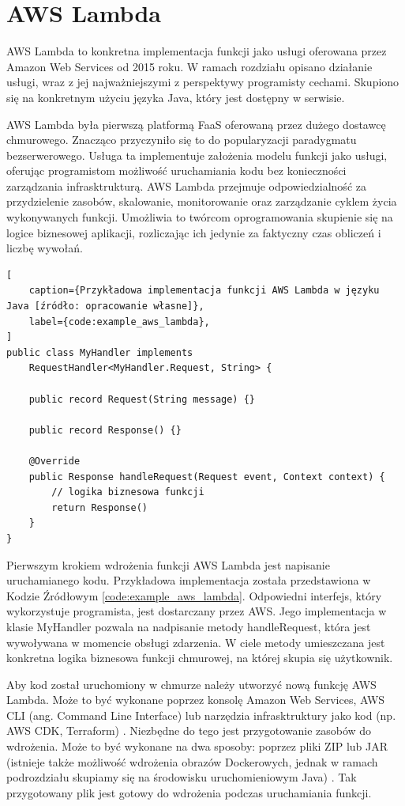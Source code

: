 \section{AWS Lambda}\label{chapter:aws_lambda}

AWS Lambda to konkretna implementacja funkcji jako usługi oferowana przez Amazon Web Services od 2015 roku.
W ramach rozdziału opisano działanie usługi, wraz z jej najważniejszymi z perspektywy programisty cechami.
Skupiono się na konkretnym użyciu języka Java, który jest dostępny w serwisie.

AWS Lambda była pierwszą platformą FaaS oferowaną przez dużego dostawcę chmurowego.
Znacząco przyczyniło się to do popularyzacji paradygmatu bezserwerowego.
Usługa ta implementuje założenia modelu funkcji jako usługi, oferując programistom możliwość uruchamiania kodu bez konieczności zarządzania infrasktrukturą.
AWS Lambda przejmuje odpowiedzialność za przydzielenie zasobów, skalowanie, monitorowanie oraz zarządzanie cyklem życia wykonywanych funkcji.
Umożliwia to twórcom oprogramowania skupienie się na logice biznesowej aplikacji, rozliczając ich jedynie za faktyczny czas obliczeń i liczbę wywołań.

\begin{lstlisting}[
    caption={Przykładowa implementacja funkcji AWS Lambda w języku Java [źródło: opracowanie własne]}, 
    label={code:example_aws_lambda},
]
public class MyHandler implements 
    RequestHandler<MyHandler.Request, String> {
    
    public record Request(String message) {}

    public record Response() {}

    @Override
    public Response handleRequest(Request event, Context context) {
        // logika biznesowa funkcji
        return Response()
    }
}
\end{lstlisting}

Pierwszym krokiem wdrożenia funkcji AWS Lambda jest napisanie uruchamianego kodu.
Przykładowa implementacja została przedstawiona w Kodzie Źródłowym \ref{code:example_aws_lambda}. 
Odpowiedni interfejs, który wykorzystuje programista, jest dostarczany przez AWS.
Jego implementacja w klasie MyHandler pozwala na nadpisanie metody handleRequest, która jest wywoływana w momencie obsługi zdarzenia.
W ciele metody umieszczana jest konkretna logika biznesowa funkcji chmurowej, na której skupia się użytkownik.

Aby kod został uruchomiony w chmurze należy utworzyć nową funkcję AWS Lambda.
Może to być wykonane poprzez konsolę Amazon Web Services, AWS CLI (ang. Command Line Interface) lub narzędzia infrasktruktury jako kod (np. AWS CDK, Terraform) \cite{awsLambdaDocs}.
Niezbędne do tego jest przygotowanie zasobów do wdrożenia.
Może to być wykonane na dwa sposoby: poprzez pliki ZIP lub JAR (istnieje także możliwość wdrożenia obrazów Dockerowych, jednak w ramach podrozdziału skupiamy się na środowisku uruchomieniowym Java) \cite{awsLambdaDocs}.
Tak przygotowany plik jest gotowy do wdrożenia podczas uruchamiania funkcji.

